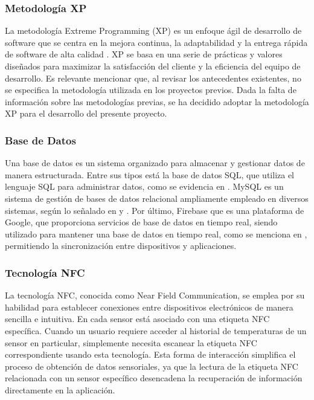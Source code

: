 \subsubsection{Metodología XP}
La metodología Extreme Programming (XP) es un enfoque ágil de desarrollo de software que se centra en la mejora continua, la adaptabilidad y la entrega rápida de software de alta calidad \cite{cabezas_orellana_alisis_2023}. XP se basa en una serie de prácticas y valores diseñados para maximizar la satisfacción del cliente y la eficiencia del equipo de desarrollo. Es relevante mencionar que, al revisar los antecedentes existentes, no se especifica la metodología utilizada en los proyectos previos. Dada la falta de información sobre las metodologías previas, se ha decidido adoptar la metodología XP para el desarrollo del presente proyecto.


\subsubsection{Base de Datos}
Una base de datos es un sistema organizado para almacenar y gestionar datos de manera estructurada. Entre sus tipos está la base de datos SQL, que utiliza el lenguaje SQL para administrar datos, como se evidencia en \cite{al-ali_iot-solar_2019}. MySQL es un sistema de gestión de bases de datos relacional ampliamente empleado en diversos sistemas, según lo señalado en \cite{alcivar_dominguez_sistema_2018} y \cite{castillo_herrero_desarrollo_2020}. Por último, Firebase que es una plataforma de Google, que proporciona servicios de base de datos en tiempo real, siendo utilizado para mantener una base de datos en tiempo real, como se menciona en \cite{ramos_galindo_diseno_2023}, permitiendo la sincronización entre dispositivos y aplicaciones.


\subsubsection{Tecnología NFC}
La tecnología NFC, conocida como Near Field Communication, se emplea por su habilidad para establecer conexiones entre dispositivos electrónicos de manera sencilla e intuitiva. En \cite{haiyan_intelligent_2022} cada sensor está asociado con una etiqueta NFC específica. Cuando un usuario requiere acceder al historial de temperaturas de un sensor en particular, simplemente necesita escanear la etiqueta NFC correspondiente usando esta tecnología. Esta forma de interacción simplifica el proceso de obtención de datos sensoriales, ya que la lectura de la etiqueta NFC relacionada con un sensor específico desencadena la recuperación de información directamente en la aplicación.



